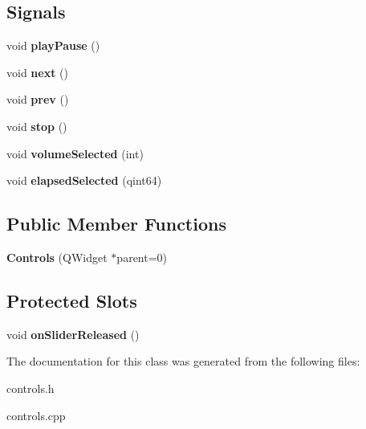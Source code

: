 \subsection*{Signals}
\begin{DoxyCompactItemize}
\item 
\hypertarget{class_controls_afe7504ad0f381214c4183e5be814abc4}{void {\bfseries play\-Pause} ()}\label{class_controls_afe7504ad0f381214c4183e5be814abc4}

\item 
\hypertarget{class_controls_af74535d8202bfdb9049eb58f7d13e690}{void {\bfseries next} ()}\label{class_controls_af74535d8202bfdb9049eb58f7d13e690}

\item 
\hypertarget{class_controls_a166980f14fdc874aecbd5b96ee631888}{void {\bfseries prev} ()}\label{class_controls_a166980f14fdc874aecbd5b96ee631888}

\item 
\hypertarget{class_controls_abcd261c1a0fe72dc44eb49bebbe0931a}{void {\bfseries stop} ()}\label{class_controls_abcd261c1a0fe72dc44eb49bebbe0931a}

\item 
\hypertarget{class_controls_ab4219d5113b05a478c25c5c41203eaf7}{void {\bfseries volume\-Selected} (int)}\label{class_controls_ab4219d5113b05a478c25c5c41203eaf7}

\item 
\hypertarget{class_controls_ac44bbe30565ace7514dbb2d0337419a6}{void {\bfseries elapsed\-Selected} (qint64)}\label{class_controls_ac44bbe30565ace7514dbb2d0337419a6}

\end{DoxyCompactItemize}
\subsection*{Public Member Functions}
\begin{DoxyCompactItemize}
\item 
\hypertarget{class_controls_a1f825cd40c51b25d483e5c11f052737c}{{\bfseries Controls} (Q\-Widget $\ast$parent=0)}\label{class_controls_a1f825cd40c51b25d483e5c11f052737c}

\end{DoxyCompactItemize}
\subsection*{Protected Slots}
\begin{DoxyCompactItemize}
\item 
\hypertarget{class_controls_a45ba0a2beabcacf2065807adce607e73}{void {\bfseries on\-Slider\-Released} ()}\label{class_controls_a45ba0a2beabcacf2065807adce607e73}

\end{DoxyCompactItemize}


The documentation for this class was generated from the following files\-:\begin{DoxyCompactItemize}
\item 
controls.\-h\item 
controls.\-cpp\end{DoxyCompactItemize}
